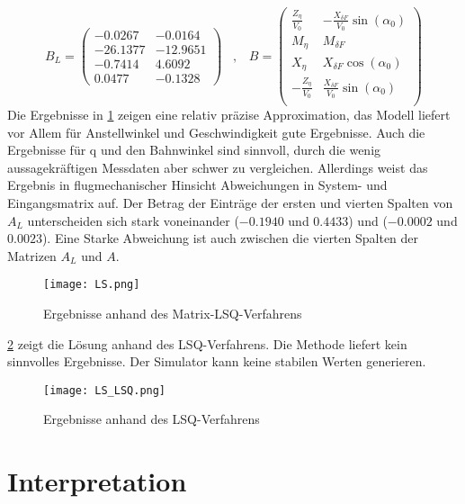 \begin{equation}
 	 B_L = \begin{pmatrix}
 		-0.0267 & -0.0164 \\ 
 		-26.1377 & -12.9651 \\
 		-0.7414 & 4.6092 \\
 		0.0477 & -0.1328
 	\end{pmatrix}  \;\;\; , \;\;\;
 	B= \begin{pmatrix}
		\frac{Z_\eta}{V_0} & -\frac{X_{\delta F}}{V_0} \sin{(\alpha_0)}\\
		M_\eta & M_{\delta F}\\
		X_\eta & X_{\delta F} \cos{(\alpha_0)}\\
		-\frac{Z_\eta}{V_0} & \frac{X_{\delta F}}{V_0} \sin{(\alpha_0)}\\
	\end{pmatrix}
 \nonumber
\end{equation}
Die Ergebnisse in \cref{fig:Ergebnisse_zmlsq} zeigen eine relativ präzise Approximation, das Modell liefert vor Allem für Anstellwinkel und Geschwindigkeit gute Ergebnisse. Auch die Ergebnisse für q und den Bahnwinkel sind sinnvoll, durch die wenig aussagekräftigen Messdaten aber schwer zu vergleichen. Allerdings weist das Ergebnis in flugmechanischer Hinsicht Abweichungen in System- und Eingangsmatrix auf. Der Betrag der Einträge der ersten und vierten Spalten von $A_L$ unterscheiden sich stark voneinander ($-0.1940$ und $0.4433$) und ($-0.0002$ und $0.0023$). Eine Starke Abweichung ist auch zwischen die vierten Spalten der Matrizen $A_L$ und $A$.  

\begin{figure}[h!]
	\centering
	\texttt{[image: LS.png]}
	\caption{Ergebnisse anhand des Matrix-LSQ-Verfahrens}
    \label{fig:Ergebnisse_zmlsq}
\end{figure}

\cref{fig:Ergebnisse_zlsq} zeigt die Lösung anhand des LSQ-Verfahrens. Die Methode liefert kein sinnvolles Ergebnisse. Der Simulator kann keine stabilen Werten generieren.

 \begin{figure}[h!]
	\centering
	\texttt{[image: LS\_LSQ.png]}
	\caption{Ergebnisse anhand des LSQ-Verfahrens}
     \label{fig:Ergebnisse_zlsq} 
\end{figure}


\section{Interpretation}

